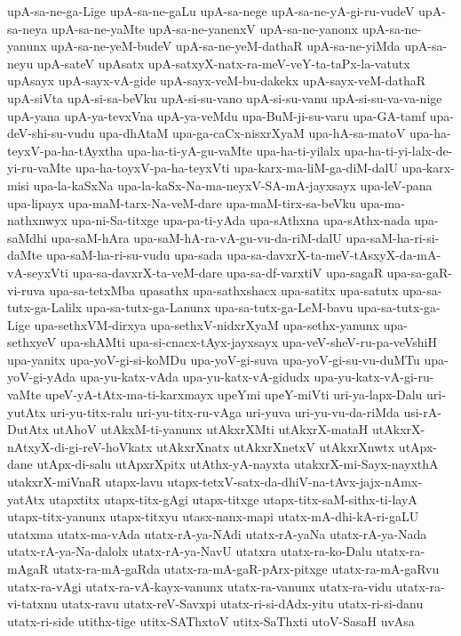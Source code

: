 {upA-sa-ne-ga-Lige
upA-sa-ne-gaLu
upA-sa-nege
upA-sa-ne-yA-gi-ru-vudeV
upA-sa-neya
upA-sa-ne-yaMte
upA-sa-ne-yanenxV
upA-sa-ne-yanonx
upA-sa-ne-yanunx
upA-sa-ne-yeM-budeV
upA-sa-ne-yeM-dathaR
upA-sa-ne-yiMda
upA-sa-neyu
upA-sateV
upAsatx
upA-satxyX-natx-ra-meV-veY-ta-taPx-la-vatutx
upAsayx
upA-sayx-vA-gide
upA-sayx-veM-bu-dakekx
upA-sayx-veM-dathaR
upA-siVta
upA-si-sa-beVku
upA-si-su-vano
upA-si-su-vanu
upA-si-su-va-va-nige
upA-yana
upA-ya-tevxVna
upA-ya-veMdu
upa-BuM-ji-su-varu
upa-GA-tamf
upa-deV-shi-su-vudu
upa-dhAtaM
upa-ga-caCx-nisxrXyaM
upa-hA-sa-matoV
upa-ha-teyxV-pa-ha-tAyxtha
upa-ha-ti-yA-gu-vaMte
upa-ha-ti-yilalx
upa-ha-ti-yi-lalx-de-yi-ru-vaMte
upa-ha-toyxV-pa-ha-teyxVti
upa-karx-ma-liM-ga-diM-dalU
upa-karx-misi
upa-la-kaSxNa
upa-la-kaSx-Na-ma-neyxV-SA-mA-jayxsayx
upa-leV-pana
upa-lipayx
upa-maM-tarx-Na-veM-dare
upa-maM-tirx-sa-beVku
upa-ma-nathxnwyx
upa-ni-Sa-titxge
upa-pa-ti-yAda
upa-sAthxna
upa-sAthx-nada
upa-saMdhi
upa-saM-hAra
upa-saM-hA-ra-vA-gu-vu-da-riM-dalU
upa-saM-ha-ri-si-daMte
upa-saM-ha-ri-su-vudu
upa-sada
upa-sa-davxrX-ta-meV-tAsxyX-da-mA-vA-seyxVti
upa-sa-davxrX-ta-veM-dare
upa-sa-df-varxtiV
upa-sagaR
upa-sa-gaR-vi-ruva
upa-sa-tetxMba
upasathx
upa-sathxshacx
upa-satitx
upa-satutx
upa-sa-tutx-ga-Lalilx
upa-sa-tutx-ga-Lanunx
upa-sa-tutx-ga-LeM-bavu
upa-sa-tutx-ga-Lige
upa-sethxVM-dirxya
upa-sethxV-nidxrXyaM
upa-sethx-yanunx
upa-sethxyeV
upa-shAMti
upa-si-cnacx-tAyx-jayxsayx
upa-veV-sheV-ru-pa-veVshiH
upa-yanitx
upa-yoV-gi-si-koMDu
upa-yoV-gi-suva
upa-yoV-gi-su-vu-duMTu
upa-yoV-gi-yAda
upa-yu-katx-vAda
upa-yu-katx-vA-gidudx
upa-yu-katx-vA-gi-ru-vaMte
upeV-yA-tAtx-ma-ti-karxmayx
upeYmi
upeY-miVti
uri-ya-lapx-Dalu
uri-yutAtx
uri-yu-titx-ralu
uri-yu-titx-ru-vAga
uri-yuva
uri-yu-vu-da-riMda
usi-rA-DutAtx
utAhoV
utAkxM-ti-yanunx
utAkxrXMti
utAkxrX-mataH
utAkxrX-nAtxyX-di-gi-reV-hoVkatx
utAkxrXnatx
utAkxrXnetxV
utAkxrXnwtx
utApx-dane
utApx-di-salu
utApxrXpitx
utAthx-yA-nayxta
utakxrX-mi-Sayx-nayxthA
utakxrX-miVnaR
utapx-lavu
utapx-tetxV-satx-da-dhiV-na-tAvx-jajx-nAmx-yatAtx
utapxtitx
utapx-titx-gAgi
utapx-titxge
utapx-titx-saM-sithx-ti-layA
utapx-titx-yanunx
utapx-titxyu
utasx-nanx-mapi
utatx-mA-dhi-kA-ri-gaLU
utatxma
utatx-ma-vAda
utatx-rA-ya-NAdi
utatx-rA-yaNa
utatx-rA-ya-Nada
utatx-rA-ya-Na-dalolx
utatx-rA-ya-NavU
utatxra
utatx-ra-ko-Dalu
utatx-ra-mAgaR
utatx-ra-mA-gaRda
utatx-ra-mA-gaR-pArx-pitxge
utatx-ra-mA-gaRvu
utatx-ra-vAgi
utatx-ra-vA-kayx-vanunx
utatx-ra-vanunx
utatx-ra-vidu
utatx-ra-vi-tatxnu
utatx-ravu
utatx-reV-Savxpi
utatx-ri-si-dAdx-yitu
utatx-ri-si-danu
utatx-ri-side
utithx-tige
utitx-SAThxtoV
utitx-SaThxti
utoV-SasaH
uvAsa
}
